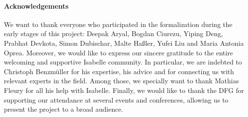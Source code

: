 \documentclass[11pt,a4paper]{article}
\begin{document}
\paragraph{Acknowledgements}
We want to thank everyone who participated in the formalization
during the early stages of this project:
Deepak Aryal, Bogdan Ciurezu, Yiping Deng, Prabhat Devkota,
Simon Dubischar, Malte Haßler, Yufei Liu and Maria Antonia Oprea. Moreover, we would like to
express our sincere gratitude to the entire welcoming and supportive Isabelle
community. In particular, we are indebted to Christoph Benzmüller for his
expertise, his advice and for connecting us with relevant experts in the field.
Among those, we specially want to thank Mathias Fleury for all his help with Isabelle.
Finally, we would like to thank the DFG for supporting our attendance at several events and conferences, allowing us to present the project to a broad audience.

\newpage





\end{document}
